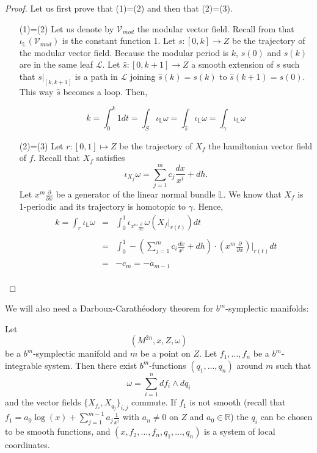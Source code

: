 \begin{proof}

Let us first prove that (1)=(2) and then that (2)=(3).
\begin{itemize}
\item[(1)=(2)] Let us denote by $\mathcal{V}_{mod}$ the modular vector field. Recall from \cite{GMW17} that $\iota_{\mathbb{L}}(\mathcal{V}_{mod})$ is the constant function 1. Let $s:[0,k]\rightarrow Z$ be the trajectory of the modular vector field. Because the modular period is $k$, $s(0)$ and $s(k)$ are in the same leaf $\mathcal{L}$. Let $\hat s :[0,k+1]\rightarrow Z$ a smooth extension of $s$ such that $s|_{[k,k+1]}$ is a path in $\mathcal{L}$ joining $\hat s (k) = s (k)$ to $\hat s (k+1) = s (0)$. This way $\hat s$ becomes a loop. Then,

$$k=\int_0^k 1 dt = \int_S \iota_{\mathbb{L}} \omega = \int_{\hat s } \iota_{\mathbb{L}}\omega=\int_\gamma\iota_{\mathbb{L}}\omega$$

\item[(2)=(3)] Let $r:[0,1] \mapsto Z$ be the trajectory of $X_f$ the hamiltonian vector field of $f$. Recall that $X_f$ satisfies
$$\iota_{X_f}\omega = \sum_{j=1}^m c_j \frac{dx}{x^i} + dh.$$
Let $x^m\frac{\partial}{\partial x}$ be a generator of the linear normal bundle $\mathbb{L}$.
We know that $X_f$ is 1-periodic and its trajectory is homotopic to $\gamma$. Hence,
$$
\begin{array}{rcl}
 k = \int_r \iota_{\mathbb{L}}\omega & = & \displaystyle \int_0^1 \iota_{x^m\frac{\partial}{\partial x}} \omega(X_f|_{r(t)})dt\\
 \\
 & = & \displaystyle \int_0^1 -(\sum_{j=1}^{m}c_i\frac{dx}{x^i} + dh)\cdot(x^m\frac{\partial}{\partial x})|_{r(t)}dt\\
 \\
 & = & -c_m = -a_{m-1}\\

\end{array}
$$
\end{itemize}

\end{proof}

We will also need a Darboux-Carathéodory theorem for $b^m$-symplectic manifolds:
\begin{theorem}\label{bmdarbouxcaratheodory}
Let
$$(M^{2n},x,Z, \omega)$$
 be a $b^m$-symplectic manifold and $m$ be a point on $Z$. Let $f_1,\ldots,f_n$ be a $b^m$-integrable system. Then there exist \textcolor{black}{$b^m$}-functions $(q_1,\ldots,q_n)$ around $m$ such that
$$\omega = \sum_{i=1}^n df_i\wedge dq_i$$
and the vector fields $\{X_{f_i},X_{q_j}\}_{i,j}$ commute.
If $f_1$ is not smooth (recall that $f_1 = a_0\log(x) + \sum_{j=1}^{m-1}a_j\frac{1}{x^i}$ with $a_n \neq 0$ on $Z$ and $a_0 \in \mathbb{R}$) the $q_i$ can be chosen to be smooth functions, and $(x,f_2,\ldots,f_n,q_1,\ldots,q_n)$ is a system of local coordinates.
\end{theorem}

